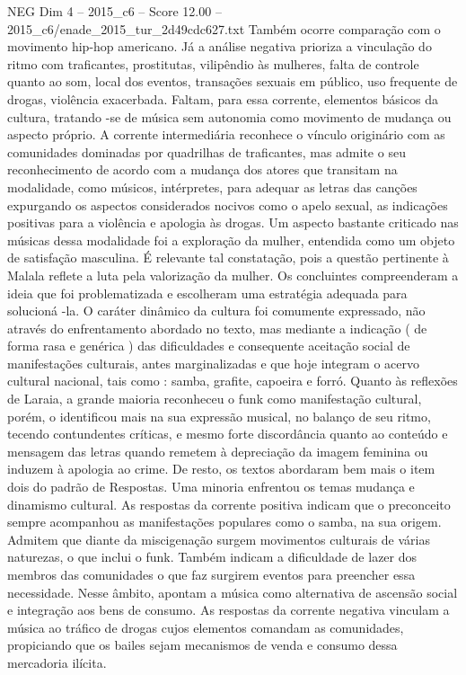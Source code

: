 \begin{textsample}{NEG Dim 4 – 2015\_c6 – Score 12.00 – 2015\_c6/enade\_2015\_tur\_2d49cdc627.txt}
Também ocorre comparação com o movimento hip-hop americano.
Já a análise negativa prioriza a vinculação do ritmo com traficantes, prostitutas, vilipêndio às mulheres, falta de controle quanto ao som, local dos eventos, transações sexuais em público, uso frequente de drogas, violência exacerbada.
Faltam, para essa corrente, elementos básicos da cultura, tratando -se de música sem autonomia como movimento de mudança ou aspecto próprio.
A corrente intermediária reconhece o vínculo originário com as comunidades dominadas por quadrilhas de traficantes, mas admite o seu reconhecimento de acordo com a mudança dos atores que transitam na modalidade, como músicos, intérpretes, para adequar as letras das canções expurgando os aspectos considerados nocivos como o apelo sexual, as indicações positivas para a violência e apologia às drogas.
Um aspecto bastante criticado nas músicas dessa modalidade foi a exploração da mulher, entendida como um objeto de satisfação masculina.
É relevante tal constatação, pois a questão pertinente à Malala reflete a luta pela valorização da mulher.
Os concluintes compreenderam a ideia que foi problematizada e escolheram uma estratégia adequada para solucioná -la.
O caráter dinâmico da cultura foi comumente expressado, não através do enfrentamento abordado no texto, mas mediante a indicação ( de forma rasa e genérica ) das dificuldades e consequente aceitação social de manifestações culturais, antes marginalizadas e que hoje integram o acervo cultural nacional, tais como : samba, grafite, capoeira e forró.
Quanto às reflexões de Laraia, a grande maioria reconheceu o funk como manifestação cultural, porém, o identificou mais na sua expressão musical, no balanço de seu ritmo, tecendo contundentes críticas, e mesmo forte discordância quanto ao conteúdo e mensagem das letras quando remetem à depreciação da imagem feminina ou induzem à apologia ao crime.
De resto, os textos abordaram bem mais o item dois do padrão de Respostas.
Uma minoria enfrentou os temas mudança e dinamismo cultural.
As respostas da corrente positiva indicam que o preconceito sempre acompanhou as manifestações populares como o samba, na sua origem.
Admitem que diante da miscigenação surgem movimentos culturais de várias naturezas, o que inclui o funk.
Também indicam a dificuldade de lazer dos membros das comunidades o que faz surgirem eventos para preencher essa necessidade.
Nesse âmbito, apontam a música como alternativa de ascensão social e integração aos bens de consumo.
As respostas da corrente negativa vinculam a música ao tráfico de drogas cujos elementos comandam as comunidades, propiciando que os bailes sejam mecanismos de venda e consumo dessa mercadoria ilícita.

\end{textsample}
